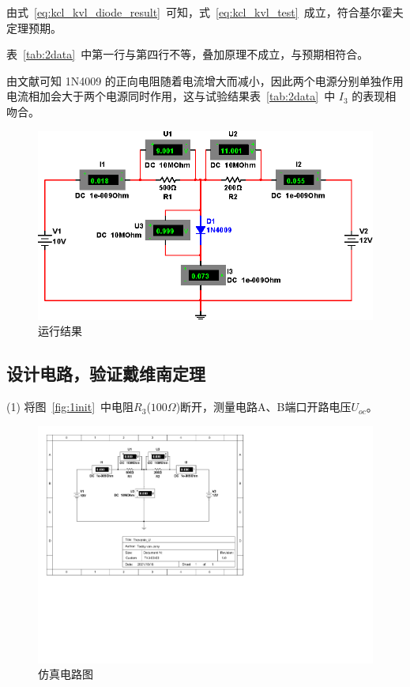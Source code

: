 \documentclass[12pt]{SEU-Circuit-Report}
\begin{document}
            由式~\eqref{eq:kcl_kvl_diode_result}~可知，式~\eqref{eq:kcl_kvl_test}~成立，符合基尔霍夫定理预期。

            表~\ref{tab:2data}~中第一行与第四行不等，叠加原理不成立，与预期相符合。

            由文献\cite{diode_data_book}可知 1N4009 的正向电阻随着电流增大而减小，因此两个电源分别单独作用电流相加会大于两个电源同时作用，这与试验结果表~\ref{tab:2data}~中 $I_3$ 的表现相吻合。

            \emptyline
            \expsimulate

            \begin{figure}[htbp]
                \centering
                \includegraphics[width=.8\linewidth]{fig/exp2_result.eps}
                \caption{运行结果}
                \label{fig:2result}
            \end{figure}

        \newpage %

        \subsection{设计电路，验证戴维南定理}
            (1) 将图~\ref{fig:1init}~中电阻$R_3$($100\Omega$)断开，测量电路A、B端口开路电压$U_{oc}$。

            \begin{figure}[htbp]
                \centering
                \includegraphics[width=.8\linewidth]{Thevenin_U.pdf}
                \caption{仿真电路图}
                \label{fig:3circuit}
            \end{figure}
\end{document}
